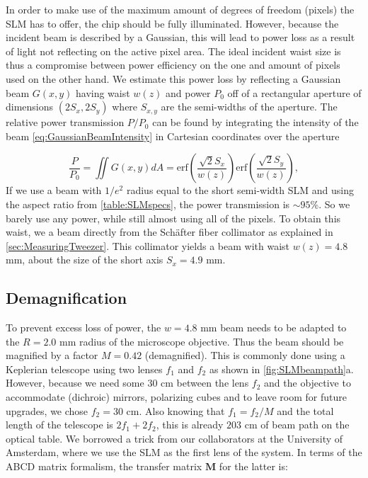 In order to make use of the maximum amount of degrees of freedom (pixels) the SLM has to offer, the chip should be fully illuminated.
However, because the incident beam is described by a Gaussian, this will lead to power loss as a result of light not reflecting on the active pixel area. 
The ideal incident waist size is thus a compromise between power efficiency on the one and amount of pixels used on the other hand.
We estimate this power loss by reflecting a Gaussian beam $G(x,y)$ having waist $w(z)$ and power $P_0$ off of a rectangular aperture of dimensions $(2S_x, 2S_y)$ where $S_{x,y}$ are the semi-widths of the aperture. 
The relative power transmission $P/P_0$ can be found by integrating the intensity of the beam \cref{eq:GaussianBeamIntensity} in Cartesian coordinates over the aperture

\begin{equation}\label{eq:RectAperturePower}
	\frac{P}{P_0} =
	\iint G(x,y) dA=
	\text{erf}\left(\frac{\sqrt{2}S_x}{w(z)}\right) \text{erf}\left(\frac{\sqrt{2}S_y}{w(z)}\right),
\end{equation}
If we use a beam with $1/e^2$ radius equal to the short semi-width SLM and using the aspect ratio from \cref{table:SLMspecs}, the power transmission is $\sim 95$\%.
So we barely use any power, while still almost using all of the pixels.
To obtain this waist, we a beam directly from the Schäfter fiber collimator as explained in \cref{sec:MeasuringTweezer}.
This collimator yields a beam with waist $w(z) = 4.8$ mm, about the size of the short axis $S_x = 4.9$ mm.

\subsection{Demagnification}

To prevent excess loss of power, the $w = 4.8$ mm beam needs to be adapted to the $R = 2.0$ mm radius of the microscope objective. 
Thus the beam should be magnified by a factor $M=0.42$ (demagnified).
This is commonly done using a Keplerian telescope using two lenses $f_1$ and $f_2$ as shown in \ref{fig:SLMbeampath}a.
However, because we need some $30$ cm between the lens $f_2$ and the objective to accommodate (dichroic) mirrors, polarizing cubes and to leave room for future upgrades, we chose $f_2=30$ cm. 
Also knowing that $f_1=f_2/M$ and the total length of the telescope is $2f_1+2f_2$, this is already $203$ cm of beam path on the optical table. 
We borrowed a trick from our collaborators at the University of Amsterdam, where we use the SLM as the first lens of the system. 
In terms of the ABCD matrix formalism, the transfer matrix $\mathbf{M}$ for the latter is:

